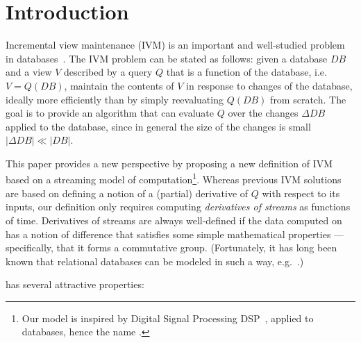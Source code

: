 \section{Introduction}\label{sec:introduction}

Incremental view maintenance (IVM) is an important and well-studied problem in
databases~\cite{gupta-idb95}.  The IVM problem can be stated as follows: given a database $DB$ and 
a view $V$ described by a query $Q$ that is a function of the database, i.e. $V = Q(DB)$, 
maintain the contents of $V$ in response to changes of the database, 
ideally more efficiently than by simply reevaluating $Q(DB)$ from scratch.  The goal is
to provide an algorithm that can evaluate $Q$ over the changes $\Delta DB$ applied
to the database, since in general the size of the changes is small $|\Delta DB| \ll |DB|$.  

This paper provides a new perspective by proposing a new definition
of IVM based on a streaming model of computation\footnote{Our model is inspired by Digital Signal 
Processing DSP~\cite{rabiner-book75}, applied to databases, hence the name \dbsp.}.  Whereas previous 
IVM solutions are based on defining a notion of a (partial) derivative of $Q$ with respect to its inputs,
our definition only requires computing \emph{derivatives of streams} as functions of time.
Derivatives of streams are always well-defined if the data computed on has a notion of difference
that satisfies some simple mathematical properties --- specifically, that it forms a commutative 
group.  (Fortunately, it has long been known that relational databases can be modeled
in such a way, e.g.~\cite{green-pods07, koch-pods10}.)

\dbsp has several attractive properties:

